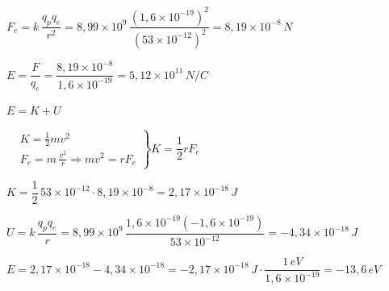 \begin{solapartat}
 $F_e = k\,\dfrac{q_pq_e}{r^2} = 8,99\times 10^{9}\,\dfrac{\left(1,6\times 10^{-19}\right)^2}{\left(53\times 10^{-12}\right)^2} = 8,19\times 10^{-8}\,N$\quad {}



 $E = \dfrac{F}{q_e} = \dfrac{8,19\times 10^{-8}}{1,6\times 10^{-19}} = 5,12\times 10^{11}\,N/C$\quad {}
\end{solapartat}

\begin{solapartat}
 $E = K + U$

 $\left.\begin{aligned} &K = \frac{1}{2}mv^2\\ &F_e = m\,\frac{v^2}{r} \Rightarrow mv^2 = rF_e \end{aligned}\right\}K = \dfrac{1}{2}rF_e$

 $K = \dfrac{1}{2}\,53\times 10^{-12}\cdot 8,19\times 10^{-8} = 2,17\times 10^{-18}\,J$

 $U = k\,\dfrac{q_pq_e}{r} = 8,99\times 10^{9}\,\dfrac{1,6\times 10^{-19}\left(-1,6\times 10^{-19}\right)}{53\times 10^{-12}} = -4,34\times 10^{-18}\,J$\quad {}

 $E = 2,17\times 10^{-18} - 4,34\times 10^{-18} = -2,17\times 10^{-18}\,J\cdot\dfrac{1\,eV}{1,6\times 10^{-19}} = -13,6\,eV$
\end{solapartat}
